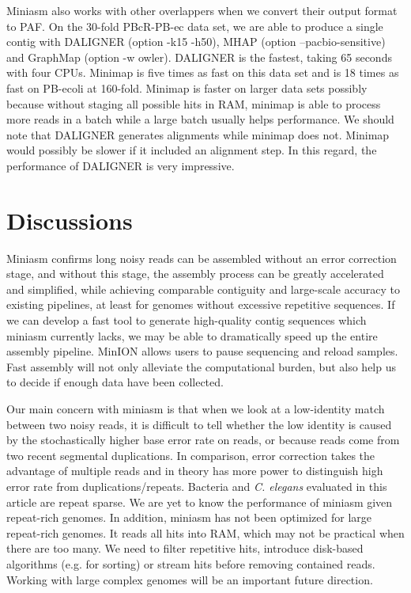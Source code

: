 \documentclass{bioinfo}
\begin{document}
Miniasm also works with other overlappers when we convert their output format
to PAF. On the 30-fold PBcR-PB-ec data set, we are able to produce a single
contig with DALIGNER (option -k15 -h50), MHAP (option
\mbox{--pacbio-sensitive}) and GraphMap (option -w owler). DALIGNER is the
fastest, taking 65 seconds with four CPUs.  Minimap is five times as fast on
this data set and is 18 times as fast on PB-ecoli at 160-fold. Minimap is
faster on larger data sets possibly because without staging all possible hits
in RAM, minimap is able to process more reads in a batch while a large batch
usually helps performance. We should note that DALIGNER generates alignments
while minimap does not. Minimap would possibly be slower if it included an
alignment step. In this regard, the performance of DALIGNER is very impressive.

\section{Discussions}

Miniasm confirms long noisy reads can be assembled without
an error correction stage, and without this stage, the assembly process can be
greatly accelerated and simplified, while achieving comparable contiguity and
large-scale accuracy to existing pipelines, at least for genomes without
excessive repetitive sequences. If we can develop a fast tool to generate
high-quality contig sequences which miniasm currently lacks, we may be able to
dramatically speed up the entire assembly pipeline. MinION allows
users to pause sequencing and reload samples. Fast assembly will not only
alleviate the computational burden, but also help us to decide if enough data
have been collected.

Our main concern with miniasm is that when we look at a low-identity match
between two noisy reads, it is difficult to tell whether the low identity is
caused by the stochastically higher base error rate on reads, or because
reads come from two recent segmental duplications.
In comparison, error correction takes the advantage of multiple reads and in
theory has more power to distinguish high error rate from duplications/repeats.
Bacteria and {\it C. elegans} evaluated in this article are repeat sparse.
We are yet to know the performance of miniasm given repeat-rich genomes.  In addition, miniasm has
not been optimized for large repeat-rich genomes. It reads all hits into RAM,
which may not be practical when there are too many. We need to filter
repetitive hits, introduce disk-based algorithms (e.g. for sorting) or stream
hits before removing contained reads. Working with large complex genomes will
be an important future direction.
\end{document}
